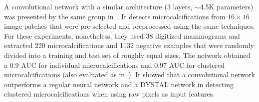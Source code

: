 
\begin{comment}
- similar to Lo 1995:
	detect microcalcifications
	pre-selected image patches
	8 rotations per image(0,90,180,270 and flipped)
	sigmoid activation function
	16 by 16 pixel size
	5 by 5 filters
	2 outputs
	clustering method
- only 10 groups per layer
- "Typically, the sizes of microcalcifications vary from 0.16 mm to 1.0 mm."
- each pixel 0.1mm, more than that may make dissapear the microcalc.
- DYSTAL network, regular neural network, and convolutional network. convnet ouptperforms them.
- rotation and translation invariance.
- gaussian-like activation function in input (?)
- 38 "digital" mammograms: 220 true and 1132 subtle microcalcififcations
- divided into two roughly equal sets for test (no cross validation)
- 0.9 AUC for microcalc and 0.97 AUC for clustered microcalcif
\end{comment}
A convolutional network with a similar architecture (3 layers, $\sim$4.5K parameters) was presented by the same group in~\cite{Lo1998}. It detects microcalcifications from $16 \times 16$ image patches that were pre-selected and preprocessed using the same techniques. For these experiments, nonetheless, they used 38 digitized mammograms and extracted 220 microcalcifications and 1132 negative examples that were randomly divided into a training and test set of roughly equal sizes. The network obtained a 0.9 AUC for individual microcalcifications and 0.97 AUC for clustered microcalcifications (also evaluated as in~\cite{Lo1995}). It showed that a convolutional network outperforms a regular neural network and a DYSTAL network in  detecting clustered microcalcifications when using raw pixels as input features.





